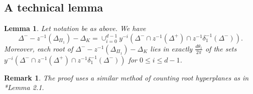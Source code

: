\documentclass[10pt,leqno]{article}
\newtheorem{lemma}[equation]{Lemma}
\newtheorem{remark}[equation]{Remark}
{\theorembodyfont{\rmfamily}
\newtheorem{theoremplain}[equation]{Theorem}
\newtheorem{remarkplain}[equation]{Remark}
\newtheorem{editorialremarkplain}[equation]{Editorial Remark}
\newtheorem{exampleplain}[equation]{Example}
\newtheorem{corollaryplain}[equation]{Corollary}
}
\def\le{\leqslant}
\def\d{\delta}
\def\th{\theta}
\def\i{^{-1}}
\begin{document}
\subsection{A technical lemma}

\begin{lemma} \label{tech}
Let notation be as above. We have $$\Delta^- - z \i(\Delta_{\Pi_1})-\Delta_K = \cup_{i=0}^{d-1} y^{-i}(\Delta^- \cap z \i(\Delta^+) \cap z \i \d_1 \i(\Delta^-)).$$ Moreover, each root of $\Delta^- - z \i(\Delta_{\Pi_1})-\Delta_K$ lies in exactly $\frac{d \th_1} {2\pi}$ of the sets $y^{-i}(\Delta^- \cap z \i(\Delta^+) \cap z \i \d_1 \i(\Delta^-))$ for $0 \le i \le d-1$.
\end{lemma}
\begin{remark}
  The proof uses a similar method of counting root hyperplanes as in
  \cite{he_nie_minimal_finite}*{Lemma 2.1}.
\end{remark}
\end{document}
